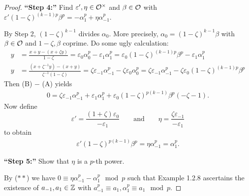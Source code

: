 \begin{proof}
	\bigskip \textbf{\enquote{Step 4:}}
	Find $\varepsilon', \eta \in \mathcal{O}^\times$ and $\beta\in\mathcal{O}$ with 
	$\varepsilon' (1-\zeta)^{(k-1)p} \beta^p = -\alpha_1^p + \eta \alpha_{-1}^p$.
	
	By Step 2, $(1-\zeta)^{k-1}$ divides $\alpha_0$. More precisely,
	$\alpha_0 = (1-\zeta)^{k-1} \beta$ with $\beta \in \mathcal{O}$ and $1-\zeta,\beta$ coprime.
	Do some ugly calculation:
	\begin{align}
	y \tag{A}
	&= \frac{x+y-(x+\zeta y)}{1-\zeta}
	= \varepsilon_0 \alpha_0^p - \varepsilon_1 \alpha_1^p
	= \varepsilon_0 (1-\zeta)^{(k-1)p} \beta^p - \varepsilon_1 \alpha_1^p \\
	y \tag{B}
	&= \frac{\left( x+ \zeta^{-1}y\right) - (x+y)}{\zeta^{-1}(1-\zeta)}
	= \zeta \varepsilon_{-1} \alpha_{-1}^p - \zeta \varepsilon_0 \alpha_0^p
	= \zeta \varepsilon_{-1} \alpha_{-1}^p - \zeta \varepsilon_0  (1-\zeta)^{(k-1)p} \beta^p
	\end{align}
	Then (B) $-$ (A) yields
	\begin{align*}
	0
	= \zeta \varepsilon_{-1} \alpha_{-1}^p +  \varepsilon_{1} \alpha_{1}^p
		+ \varepsilon_{0} (1-\zeta) ^{p(k-1)} \beta^p (-\zeta -1).
	\end{align*}
	Now define
	\[ \varepsilon' = \frac{(1+\zeta) \varepsilon_0}{-\varepsilon_1}
	\qquad \text{and} \qquad
	\eta = \frac{\zeta\varepsilon_{-1}}{-\varepsilon_1}
	\]
	to obtain 
	\begin{align} \tag{$**$}
	\varepsilon'  (1-\zeta) ^{p(k-1)} \beta^p = \eta \alpha_{-1}^p = \alpha_1^p.
	\end{align}
	
	\bigskip \textbf{\enquote{Step 5:}}
	Show that $\eta$ is a $p$-th power.
	
	By ($**$) we have $0\equiv\eta \alpha_{-1}^p - \alpha_1^p \mod p$ such that
	Example 1.2.8 ascertains the existence of $a_{-1}, a_1 \in \mathbb{Z}$ with
	$a_{-1}^p\equiv a_1, \alpha_1^p \equiv a_1 \mod p$.
\end{proof}






























